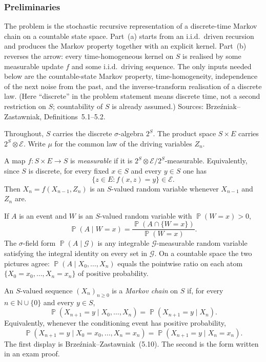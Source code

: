 \documentclass[11pt,a4paper]{article}
\DeclareMathOperator{\Pbb}{\mathbb{P}}
\begin{document}
\subsubsection{Preliminaries}

The problem is the stochastic recursive representation of a discrete-time Markov chain on a countable state space. Part~(a) starts from an i.i.d.\ driven recursion and produces the Markov property together with an explicit kernel. Part~(b) reverses the arrow: every time-homogeneous kernel on \(S\) is realised by some measurable update \(f\) and some i.i.d.\ driving sequence. The only inputs needed below are the countable-state Markov property, time-homogeneity, independence of the next noise from the past, and the inverse-transform realisation of a discrete law. (Here ``discrete'' in the problem statement means discrete time, not a second restriction on \(S\); countability of \(S\) is already assumed.) Sources: Brzeźniak--Zastawniak, Definitions~5.1--5.2.

Throughout, \(S\) carries the discrete \(\sigma\)-algebra \(2^{S}\). The product space \(S\times E\) carries \(2^{S}\otimes\mathcal{E}\). Write \(\mu\) for the common law of the driving variables \(Z_n\).

\begin{definition}
\label{def:p5-update}
A map \(f:S\times E\to S\) is \emph{measurable} if it is \(2^{S}\otimes\mathcal{E}/2^{S}\)-measurable. Equivalently, since \(S\) is discrete, for every fixed \(x\in S\) and every \(y\in S\) one has
\[
\{z\in E:f(x,z)=y\}\in\mathcal{E}.
\]
Then \(X_n=f(X_{n-1},Z_n)\) is an \(S\)-valued random variable whenever \(X_{n-1}\) and \(Z_n\) are.
\end{definition}

\begin{definition}
\label{def:p5-cond}
If \(A\) is an event and \(W\) is an \(S\)-valued random variable with \(\Pbb(W=x)>0\),
\[
\Pbb(A\mid W=x)
=
\frac{\Pbb(A\cap\{W=x\})}{\Pbb(W=x)}.
\]
The \(\sigma\)-field form \(\Pbb(A\mid\mathcal{G})\) is any integrable \(\mathcal{G}\)-measurable random variable satisfying the integral identity on every set in \(\mathcal{G}\). On a countable space the two pictures agree: \(\Pbb(A\mid X_0,\dots,X_n)\) equals the pointwise ratio on each atom \(\{X_0=x_0,\dots,X_n=x_n\}\) of positive probability.
\end{definition}

\begin{definition}
\label{def:p5-mc}
An \(S\)-valued sequence \((X_n)_{n\ge 0}\) is a \emph{Markov chain} on \(S\) if, for every \(n\in\mathbb{N}\cup\{0\}\) and every \(y\in S\),
\[
\Pbb(X_{n+1}=y\mid X_0,\dots,X_n)
=
\Pbb(X_{n+1}=y\mid X_n).
\]
Equivalently, whenever the conditioning event has positive probability,
\[
\Pbb(X_{n+1}=y\mid X_0=x_0,\dots,X_n=x_n)
=
\Pbb(X_{n+1}=y\mid X_n=x_n).
\]
The first display is Brzeźniak--Zastawniak~(5.10). The second is the form written in an exam proof.
\end{definition}
\end{document}
